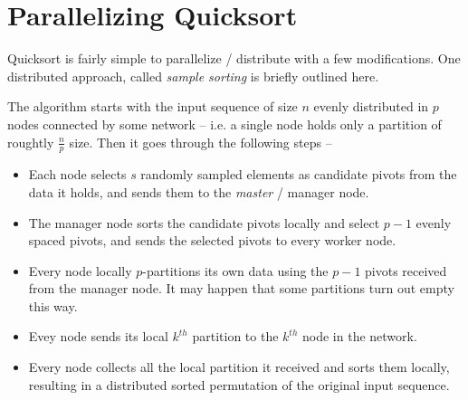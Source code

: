 \documentclass[]{finalproject}
\begin{document}
\section{Parallelizing Quicksort}

Quicksort is fairly simple to parallelize / distribute with a few modifications. One distributed approach, called \textit{sample sorting} is briefly outlined here.

The algorithm starts with the input sequence of size $n$ evenly distributed in $p$ nodes connected by some network -- i.e. a single node holds only a partition of roughtly $\frac{n}{p}$ size. Then it goes through the following steps --
\begin{itemize}
\item Each node selects $s$ randomly sampled elements as candidate pivots from the data it holds, and sends them to the \textit{master} / manager node.
\item The manager node sorts the candidate pivots locally and select $p-1$ evenly spaced pivots, and sends the selected pivots to every worker node.
\item Every node locally $p$-partitions its own data using the $p-1$ pivots received from the manager node. It may happen that some partitions turn out empty this way.
\item Evey node sends its local $k^{th}$ partition to the $k^{th}$ node in the network.
\item Every node collects all the local partition it received and sorts them locally, resulting in a distributed sorted permutation of the original input sequence.
\end{itemize}
\end{document}
